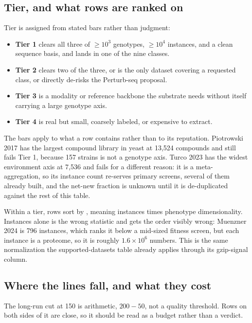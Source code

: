 \subsection{Tier, and what rows are ranked on}

Tier is assigned from stated bars rather than judgment:

\begin{itemize}[leftmargin=1.2em,itemsep=1pt,topsep=2pt]
  \item \textbf{Tier 1} clears all three of $\geq$$10^3$ genotypes, $\geq$$10^4$ instances,
    and a clean sequence basis, and lands in one of the nine classes.
  \item \textbf{Tier 2} clears two of the three, or is the only dataset covering a
    requested class, or directly de-risks the Perturb-seq proposal.
  \item \textbf{Tier 3} is a modality or reference backbone the substrate needs without
    itself carrying a large genotype axis.
  \item \textbf{Tier 4} is real but small, coarsely labeled, or expensive to extract.
\end{itemize}

The bars apply to what a row contains rather than to its reputation. Piotrowski 2017 has
the largest compound library in yeast at 13,524 compounds and still fails Tier 1, because
157 strains is not a genotype axis. Turco 2023 has the widest environment axis at 7,536 and
fails for a different reason: it is a meta-aggregation, so its instance count re-serves
primary screens, several of them already built, and the net-new fraction is unknown until
it is de-duplicated against the rest of this table.

Within a tier, rows sort by , meaning instances times phenotype
dimensionality. Instances alone is the wrong statistic and gets the order visibly wrong:
Muenzner 2024 is 796 instances, which ranks it below a mid-sized fitness screen, but each
instance is a proteome, so it is roughly $1.6\times10^6$ numbers. This is the same
normalization the supported-datasets table already applies through its gzip-signal column.

\subsection{Where the lines fall, and what they cost}

The long-run cut at 150 is arithmetic, $200-50$, not a quality threshold. Rows on both
sides of it are close, so it should be read as a budget rather than a verdict.

